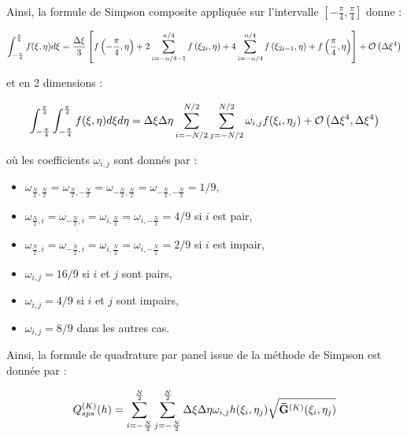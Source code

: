 Ainsi, la formule de Simpson composite appliquée sur l'intervalle $\left[ - \frac{\pi}{4}, \frac{\pi}{4} \right]$ donne :

\begin{equation}
\displaystyle\int_{-\frac{\pi}{4}}^{\frac{\pi}{4}} f(\xi, \eta) d\xi = \dfrac{\Delta \xi}{3} \left[ f\left( - \dfrac{\pi}{4}, \eta \right) + 2 \displaystyle\sum\limits_{i=-n/4-1}^{n/4} f\left( \xi_{2i}, \eta \right) + 4\displaystyle\sum\limits_{i=-n/4}^{n/4} f\left( \xi_{2i-1}, \eta \right) + f \left( \dfrac{\pi}{4}, \eta \right) \right] + \mathcal{O}\left( \Delta \xi^4 \right)
\end{equation}

et en 2 dimensions :

\begin{equation}
\displaystyle\int_{-\frac{\pi}{4}}^{\frac{\pi}{4}} \displaystyle\int_{-\frac{\pi}{4}}^{\frac{\pi}{4}} f(\xi, \eta) d\xi  d\eta= \Delta\xi \Delta \eta \displaystyle\sum\limits_{i=-N/2}^{N/2}\displaystyle\sum\limits_{j=-N/2}^{N/2} \omega_{i,j} f(\xi_i, \eta_j) + \mathcal{O}\left( \Delta \xi^4, \Delta \xi^4 \right)
\label{eq:simpson 2d}
\end{equation}

où les coefficients $\omega_{i,j}$ sont donnés par :
\begin{itemize}
\item $\omega_{\frac{N}{2},\frac{N}{2}}=\omega_{\frac{N}{2},-\frac{N}{2}}=\omega_{-\frac{N}{2},\frac{N}{2}}=\omega_{-\frac{N}{2},-\frac{N}{2}}=1/9$,
\item $\omega_{\frac{N}{2},i}=\omega_{-\frac{N}{2},i}=\omega_{i,\frac{N}{2}}=\omega_{i,-\frac{N}{2}}=4/9$ si $i$ est pair,
\item $\omega_{\frac{N}{2},i}=\omega_{-\frac{N}{2},i}=\omega_{i,\frac{N}{2}}=\omega_{i,-\frac{N}{2}}=2/9$ si $i$ est impair,
\item $\omega_{i,j}=16/9$ si $i$ et $j$ sont pairs,
\item $\omega_{i,j}=4/9$ si $i$ et $j$ sont impairs,
\item $\omega_{i,j}=8/9$ dans les autres cas.
\end{itemize}


Ainsi, la formule de quadrature par panel issue de la méthode de Simpson est donnée par :

\begin{equation}
Q_{sps}^{(K)}(h)=\displaystyle\sum\limits_{i = -\frac{N}{2}}^{\frac{N}{2}}\displaystyle\sum\limits_{j = -\frac{N}{2}}^{\frac{N}{2}} \Delta \xi \Delta \eta \omega_{i,j} h(\xi_i, \eta_j) \sqrt{\mathbf{\bar{G}}^{(K)}(\xi_i, \eta_j)}
\label{eq:simpson par panel}
\end{equation}

